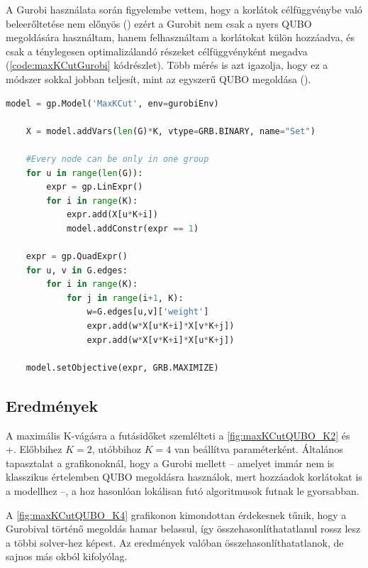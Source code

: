 A Gurobi használata során figyelembe vettem, hogy a korlátok célfüggvénybe való beleerőltetése nem előnyös () ezért a Gurobit nem csak a nyers QUBO megoldására használtam, hanem felhasználtam a korlátokat külön hozzáadva, és csak a ténylegesen optimalizálandó részeket célfüggvényként megadva (\ref{code:maxKCutGurobi} kódrészlet). Több mérés is azt igazolja, hogy ez a módszer sokkal jobban teljesít, mint az egyszerű QUBO megoldása ().

\begin{lstlisting}[language=python,caption=Maximális K-vágás Gurobival ,label=code:maxKCutGurobi]
  model = gp.Model('MaxKCut', env=gurobiEnv)

	X = model.addVars(len(G)*K, vtype=GRB.BINARY, name="Set")
	
	#Every node can be only in one group
	for u in range(len(G)):
		expr = gp.LinExpr()
		for i in range(K):
			expr.add(X[u*K+i])
			model.addConstr(expr == 1)
	
	expr = gp.QuadExpr()
	for u, v in G.edges:
		for i in range(K):
			for j in range(i+1, K):
				w=G.edges[u,v]['weight']
				expr.add(w*X[u*K+i]*X[v*K+j])
				expr.add(w*X[v*K+i]*X[u*K+j])
	
	model.setObjective(expr, GRB.MAXIMIZE)
\end{lstlisting}

\subsection{Eredmények}


A maximális K-vágásra a futásidőket szemlélteti a \ref{fig:maxKCutQUBO_K2} és \az+. Előbbihez $K=2$, utóbbihoz $K=4$ van beállítva paraméterként. Általános tapasztalat a grafikonoknál, hogy a Gurobi mellett -- amelyet immár nem is klasszikus értelemben QUBO megoldásra használok, mert hozzáadok korlátokat is a modellhez --, a hoz hasonlóan lokálisan futó algoritmusok futnak le gyorsabban.

A \ref{fig:maxKCutQUBO_K4} grafikonon kimondottan érdekesnek tűnik, hogy a Gurobival történő megoldás hamar belassul, így összehasonlíthatatlanul rossz lesz a többi solver-hez képest. Az eredmények valóban összehasonlíthatatlanok, de sajnos más okból kifolyólag.

